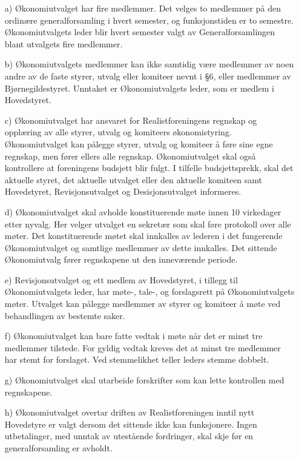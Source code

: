\begin{itemize}
\item[a)] Økonomiutvalget har fire medlemmer. Det velges to medlemmer på den
ordinære generalforsamling i hvert semester, og funksjonstiden er to
semestre.  Økonomiutvalgets leder blir hvert semester valgt av
Generalforsamlingen blant utvalgets fire medlemmer.

\item[b)] Økonomiutvalgets medlemmer kan ikke samtidig være medlemmer av noen
andre av de faste styrer, utvalg eller komiteer nevnt i §6, eller
medlemmer av Bjørnegildestyret. Unntaket er Økonomiutvalgets leder,
som er medlem i Hovedstyret.

\item[c)] Økonomiutvalget har ansvaret for Realistforeningens regnskap og
opplæring av alle styrer, utvalg og komiteers økonomistyring.
Økonomiutvalget kan pålegge styrer, utvalg og komiteer å føre sine
egne regnskap, men fører ellers alle regnskap.  Økonomiutvalget skal
også kontrollere at foreningens budsjett blir fulgt.  I tilfelle
budsjettsprekk, skal det aktuelle styret, det aktuelle utvalget
eller den aktuelle komiteen samt Hovedstyret, Revisjonsutvalget og
Desisjonsutvalget informeres.

\item[d)] Økonomiutvalget skal avholde konstituerende møte innen 10 virkedager
etter nyvalg. Her velger utvalget en sekretær som skal føre protokoll
over alle møter.  Det konstituerende møtet skal innkalles av lederen i
det fungerende Økonomiutvalget og samtlige medlemmer av dette
innkalles.  Det sittende Økonomiutvalg fører regnskapene ut den 
inneværende periode.

\item[e)] Revisjonsutvalget og ett medlem av Hovedstyret, i tillegg til
Økonomiutvalgets leder, har møte-, tale-, og forslagsrett på
Økonomiutvalgets møter. Utvalget kan pålegge medlemmer av styrer og
komiteer å møte ved behandlingen av bestemte saker.

\item[f)] Økonomiutvalget kan bare fatte vedtak i møte når det er minst tre
medlemmer tilstede. For gyldig vedtak kreves det at minst tre
medlemmer har stemt for forslaget. Ved stemmelikhet teller leders
stemme dobbelt.

\item[g)] Økonomiutvalget skal utarbeide forskrifter som kan lette kontrollen
med regnskapene.

\item[h)] Økonomiutvalget overtar driften av Realistforeningen inntil nytt
Hovedstyre er valgt dersom det sittende ikke kan funksjonere. Ingen
utbetalinger, med unntak av utestående fordringer, skal skje før en
generalforsamling er avholdt.
\end{itemize}
 

